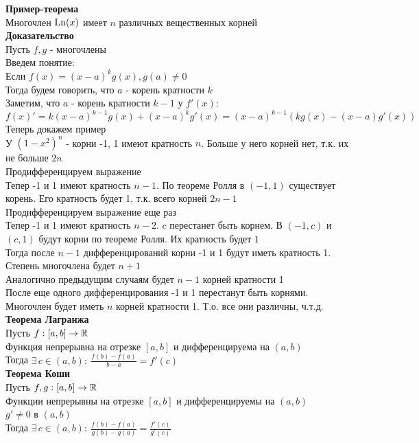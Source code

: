 \documentclass[12pt]{article}
\begin{document}
\textbf{Пример-теорема}\\
Многочлен $\operatorname{Ln}(x)$ имеет $n$ различных вещественных корней\\
\textbf{Доказательство}\\
Пусть $f,g$ - многочлены\\
Введем понятие:\\
Если $f(x) = (x-a)^k g(x), g(a) \neq 0$\\
Тогда будем говорить, что $a$ - корень кратности $k$\\
Заметим, что $a$ - корень кратности $k-1$ у $f'(x)$:\\
$f(x)' = k(x-a)^{k-1}g(x) + (x-a)^kg'(x) = (x-a)^{k-1}(kg(x)-(x-a)g'(x))$\\
Теперь докажем пример\\
У $(1-x^2)^n$ - корни -1, 1 имеют кратность $n$. Больше у него корней нет, т.к. их не больше $2n$\\
Продифференцируем выражение\\
Тепер -1 и 1 имеют кратность $n-1$. По теореме Ролля в $(-1, 1)$ существует корень. Его кратность будет 1, т.к. всего корней $2n-1$\\
Продифференцируем выражение еще раз\\
Тепер -1 и 1 имеют кратность $n-2$. $c$ перестанет быть корнем. В $(-1, c)$ и $(c, 1)$ будут корни по теореме Ролля. Их кратность будет $1$\\
Тогда после $n-1$ дифференцирований корни -1 и 1 будут иметь кратность 1. Степень многочлена будет $n+1$\\ Аналогично предыдущим случаям будет $n-1$ корней кратности 1\\
После еще одного дифференцирования -1 и 1 перестанут быть корнями. Многочлен будет иметь $n$ корней кратности 1. Т.о. все они различны, ч.т.д.\\
\textbf{Теорема Лагранжа}\\
Пусть $f:[a,b] \rightarrow \mathbb{R}$\\
Функция непрерывна на отрезке $[a,b]$ и дифференцируема на $(a,b)$\\
Тогда $\exists\,c\in(a,b):\ \frac{f(b)-f(a)}{b-a} = f'(c)$\\
\textbf{Теорема Коши}\\
Пусть $f, g:[a,b] \rightarrow \mathbb{R}$\\
Функции непрерывны на отрезке $[a,b]$ и дифференцируемы на $(a,b)$\\
$g' \neq 0$ в $(a,b)$\\
Тогда $\exists\,c\in(a,b):\ \frac{f(b)-f(a)}{g(b)-g(a)} = \frac{f'(c)}{g'(c)}$\\
\end{document}
